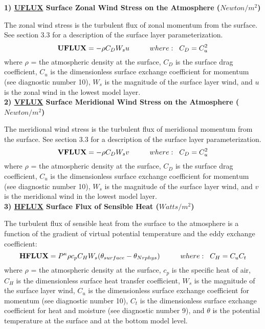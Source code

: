 {\bf 1)  \underline {UFLUX} Surface Zonal Wind Stress on the Atmosphere ($Newton/m^2$) } 

The zonal wind stress is the turbulent flux of zonal momentum from 
the surface. See section 3.3 for a description of the surface layer parameterization.
\[
{\bf UFLUX} =  - \rho C_D W_s u \hspace{1cm}where: \hspace{.2cm}C_D = C^2_u
\]
where $\rho$ = the atmospheric density at the surface, $C_{D}$ is the surface
drag coefficient, $C_u$ is the dimensionless surface exchange coefficient for momentum 
(see diagnostic number 10), $W_s$ is the magnitude of the surface layer wind, and $u$ is 
the zonal wind in the lowest model layer.
\\


{\bf 2)  \underline {VFLUX} Surface Meridional Wind Stress on the Atmosphere ($Newton/m^2$) } 

The meridional wind stress is the turbulent flux of meridional momentum from 
the surface. See section 3.3 for a description of the surface layer parameterization.
\[
{\bf VFLUX} =  - \rho C_D W_s v \hspace{1cm}where: \hspace{.2cm}C_D = C^2_u
\]
where $\rho$ = the atmospheric density at the surface, $C_{D}$ is the surface
drag coefficient, $C_u$ is the dimensionless surface exchange coefficient for momentum 
(see diagnostic number 10), $W_s$ is the magnitude of the surface layer wind, and $v$ is 
the meridional wind in the lowest model layer.
\\

{\bf 3)  \underline {HFLUX} Surface Flux of Sensible Heat ($Watts/m^2$) } 

The turbulent flux of sensible heat from the surface to the atmosphere is a function of the
gradient of virtual potential temperature and the eddy exchange coefficient:
\[
{\bf HFLUX} =  P^{\kappa}\rho c_{p} C_{H} W_s (\theta_{surface} - \theta_{Nrphys})
\hspace{1cm}where: \hspace{.2cm}C_H = C_u C_t
\]
where $\rho$ = the atmospheric density at the surface, $c_{p}$ is the specific
heat of air, $C_{H}$ is the dimensionless surface heat transfer coefficient, $W_s$ is the 
magnitude of the surface layer wind, $C_u$ is the dimensionless surface exchange coefficient 
for momentum (see diagnostic number 10), $C_t$ is the dimensionless surface exchange coefficient 
for heat and moisture (see diagnostic number 9), and $\theta$ is the potential temperature 
at the surface and at the bottom model level.
\\


